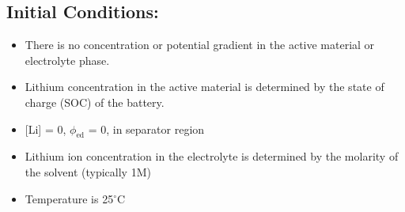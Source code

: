 \documentclass[12pt]{article}
\begin{document}
	\subsection{Initial Conditions:}
	\begin{itemize}
		\item There is no concentration or potential gradient in the active material or electrolyte phase.
		\item Lithium concentration in the active material is determined by the state of charge (SOC) of the battery.
		\item {[}Li{]} = 0, $\phi_\textrm{ed}$ =  0, in separator region
		\item Lithium ion concentration in the electrolyte is determined by the molarity of the solvent (typically 1M)
		\item Temperature is 25$^\circ$C
	\end{itemize}
\clearpage
\end{document}
